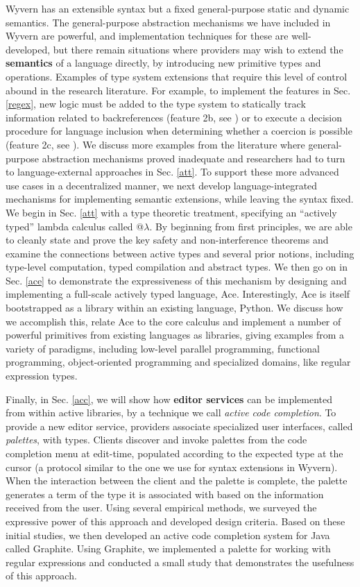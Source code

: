 Wyvern has an extensible syntax but a fixed general-purpose static and dynamic semantics. The general-purpose abstraction mechanisms we have included in Wyvern are powerful, and implementation techniques for these are well-developed, but there remain situations where providers may wish to extend the \textbf{semantics} of a language directly, by introducing new primitive types and operations. Examples of type system extensions that require this level of control abound in the research literature. For example, to implement the features in Sec. \ref{regex}, new logic must be added to the type system to statically track information related to backreferences (feature 2b, see \cite{spishak2012type}) or to execute a decision procedure for language inclusion when determining whether a coercion is possible (feature 2c, see \cite{fulton-thesis}). We discuss more examples from the literature where general-purpose abstraction mechanisms proved inadequate and researchers had to turn to language-external approaches in Sec. \ref{att}. To support these more advanced use cases in a decentralized manner, we next develop language-integrated mechanisms for implementing semantic extensions, while leaving the syntax fixed. We begin in Sec. \ref{att} with a type theoretic treatment, specifying an ``actively typed'' lambda calculus called @$\lambda$. By beginning from first principles, we are able to cleanly state and prove the key safety and non-interference theorems and examine the connections between active types and several prior notions, including type-level computation, typed compilation and abstract types. We then go on in Sec. \ref{ace} to demonstrate the expressiveness of this mechanism by designing and implementing a full-scale actively typed language, Ace. Interestingly, Ace is itself bootstrapped as a library within an existing language, Python. We discuss how we accomplish this, relate Ace to the core calculus and implement a number of powerful primitives from existing languages as libraries, giving examples from a variety of paradigms, including low-level parallel programming, functional programming, object-oriented programming and specialized domains, like regular expression types.

Finally, in Sec. \ref{acc}, we will show how \textbf{editor services} can be implemented from within active libraries, by a technique we call \emph{active code completion}. To provide a new editor service, providers associate
specialized user interfaces, called \emph{palettes}, with types. Clients discover and invoke palettes from the code completion menu at edit-time, populated according to the expected type at the cursor (a protocol similar to the one we use for syntax extensions in Wyvern). When the interaction between the client and the palette is complete, the palette generates a term of the type it is associated with based on the information received from the user. Using several empirical
methods, we surveyed the expressive power of this approach and developed design criteria. Based on these initial studies, we then developed an active code completion system for Java called Graphite. Using Graphite,
we implemented a palette for working with regular expressions and conducted a small study that demonstrates the usefulness of this approach.

